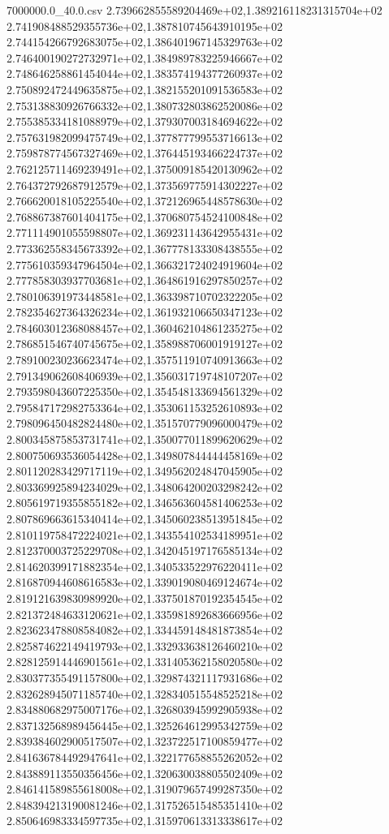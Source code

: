 \begin{filecontents*}{7000000.0_40.0.csv}
2.739662855589204469e+02,1.389216118231315704e+02
2.741908488529355736e+02,1.387810745643910195e+02
2.744154266792683075e+02,1.386401967145329763e+02
2.746400190272732971e+02,1.384989783225946667e+02
2.748646258861454044e+02,1.383574194377260937e+02
2.750892472449635875e+02,1.382155201091536583e+02
2.753138830926766332e+02,1.380732803862520086e+02
2.755385334181088979e+02,1.379307003184694622e+02
2.757631982099475749e+02,1.377877799553716613e+02
2.759878774567327469e+02,1.376445193466224737e+02
2.762125711469239491e+02,1.375009185420130962e+02
2.764372792687912579e+02,1.373569775914302227e+02
2.766620018105225540e+02,1.372126965448578630e+02
2.768867387601404175e+02,1.370680754524100848e+02
2.771114901055598807e+02,1.369231143642955431e+02
2.773362558345673392e+02,1.367778133308438555e+02
2.775610359347964504e+02,1.366321724024919604e+02
2.777858303937703681e+02,1.364861916297850257e+02
2.780106391973448581e+02,1.363398710702322205e+02
2.782354627364326234e+02,1.361932106650347123e+02
2.784603012368088457e+02,1.360462104861235275e+02
2.786851546740745675e+02,1.358988706001919127e+02
2.789100230236623474e+02,1.357511910740913663e+02
2.791349062608406939e+02,1.356031719748107207e+02
2.793598043607225350e+02,1.354548133694561329e+02
2.795847172982753364e+02,1.353061153252610893e+02
2.798096450482824480e+02,1.351570779096000479e+02
2.800345875853731741e+02,1.350077011899620629e+02
2.800750693536054428e+02,1.349807844444458169e+02
2.801120283429717119e+02,1.349562024847045905e+02
2.803369925894234029e+02,1.348064200203298242e+02
2.805619719355855182e+02,1.346563604581406253e+02
2.807869663615340414e+02,1.345060238513951845e+02
2.810119758472224021e+02,1.343554102534189951e+02
2.812370003725229708e+02,1.342045197176585134e+02
2.814620399171882354e+02,1.340533522976220411e+02
2.816870944608616583e+02,1.339019080469124674e+02
2.819121639830989920e+02,1.337501870192354545e+02
2.821372484633120621e+02,1.335981892683666956e+02
2.823623478808584082e+02,1.334459148481873854e+02
2.825874622149419793e+02,1.332933638126460210e+02
2.828125914446901561e+02,1.331405362158020580e+02
2.830377355491157800e+02,1.329874321117931686e+02
2.832628945071185740e+02,1.328340515548525218e+02
2.834880682975007176e+02,1.326803945992905938e+02
2.837132568989456445e+02,1.325264612995342759e+02
2.839384602900517507e+02,1.323722517100859477e+02
2.841636784492947641e+02,1.322177658855262052e+02
2.843889113550356456e+02,1.320630038805502409e+02
2.846141589855618008e+02,1.319079657499287350e+02
2.848394213190081246e+02,1.317526515485351410e+02
2.850646983334597735e+02,1.315970613313338617e+02

\end{filecontents*}
